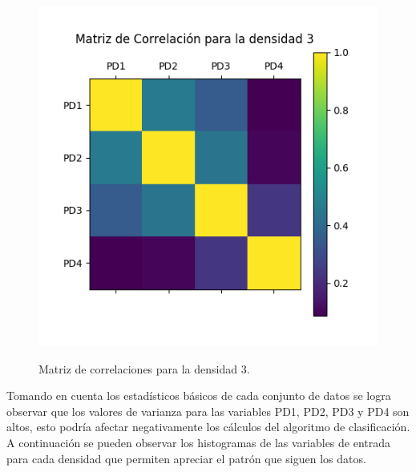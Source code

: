\begin{figure}[h!]
	\caption{Matriz de correlaciones para la densidad 3.}
	\centering
	\includegraphics[scale=0.5]{correlacionD3.jpg}
	\label{fig:cd3}
\end{figure}

Tomando en cuenta los estadísticos básicos de cada conjunto de datos se logra observar que los valores de varianza para las variables PD1, PD2, PD3 y PD4 son altos, esto podría afectar negativamente los cálculos del algoritmo de clasificación. A continuación se pueden observar los
histogramas de las variables de entrada para cada densidad que permiten apreciar el patrón que siguen los datos.\\\\\\\\\\\\\\\\\\\\\\\\\\\\

